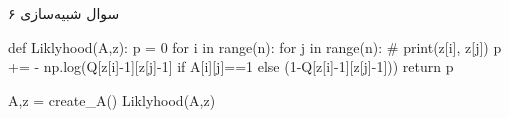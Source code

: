 سوال شبیه‌سازی ۶

\begin{latin}
\begin{python}
def Liklyhood(A,z):
    p = 0
    for i in range(n):
        for j in range(n):
            # print(z[i], z[j])
            p += - np.log(Q[z[i]-1][z[j]-1] if A[i][j]==1 
            else (1-Q[z[i]-1][z[j]-1]))
    return p

A,z = create_A()
Liklyhood(A,z)
\end{python}
\end{latin}